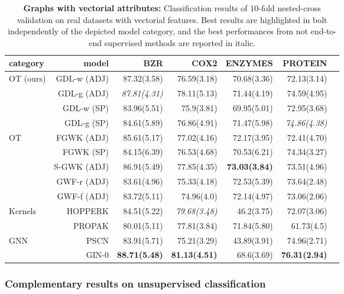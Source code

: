 \documentclass{article}
\begin{document}
	\begin{table}[!h]
		\centering
		\caption{\textbf{Graphs with vectorial attributes:} Classification results of 10-fold nested-cross validation on real datasets with vectorial features. Best results are highlighted in bolt independently of the depicted model category, and the best performances from not end-to-end supervised methods are reported in italic.}
		\label{tab:res3}
		\scalebox{0.81}
		{\begin{tabular}{|l|r|r|r|r|r|r|}
				\hline
				category & model & BZR & COX2 & ENZYMES & PROTEIN \\  \hline
				OT (ours) & GDL-w (ADJ)& 87.32(3.58)& 76.59(3.18) & 70.68(3.36) & 72.13(3.14)\\ 
				& GDL-g (ADJ) &  \textit{87.81(4.31)}& 78.11(5.13) & 71.44(4.19) & 74.59(4.95)\\ 
				& GDL-w (SP) &  83.96(5.51)& 75.9(3.81) & 69.95(5.01) & 72.95(3.68)\\ 
				& GDL-g (SP) &  84.61(5.89)& 76.86(4.91) & 71.47(5.98)& \textit{74.86(4.38)}\\ \hline
				OT& FGWK (ADJ) & 85.61(5.17) & 77.02(4.16) & 72.17(3.95) & 72.41(4.70)\\
				& FGWK (SP) & 84.15(6.39) & 76.53(4.68) & 70.53(6.21)& 74.34(3.27)\\
				&S-GWK (ADJ)& 86.91(5.49) & 77.85(4.35) & \textbf{73.03(3.84)} & 73.51(4.96)\\
				& GWF-r (ADJ) & 83.61(4.96) & 75.33(4.18) & 72.53(5.39)& 73.64(2.48)\\
				& GWF-f (ADJ) & 83.72(5.11) & 74.96(4.0) & 72.14(4.97)& 73.06(2.06)\\
				\hline
				
				Kernels & HOPPERK& 84.51(5.22) & \textit{79.68(3.48)}& 46.2(3.75) & 72.07(3.06)\\
				& PROPAK& 80.01(5.11) & 77.81(3.84)& 71.84(5.80)& 61.73(4.5)\\ \hline
				GNN & PSCN& 83.91(5.71) & 75.21(3.29)& 43.89(3.91) & 74.96(2.71)\\
				& GIN-0& \textbf{88.71(5.48)} & \textbf{81.13(4.51)}& 68.6(3.69) & \textbf{76.31(2.94)}\\ \hline
		\end{tabular}}
	\end{table}
	\newpage
	\subsubsection{Complementary results on unsupervised classification}
\end{document}
